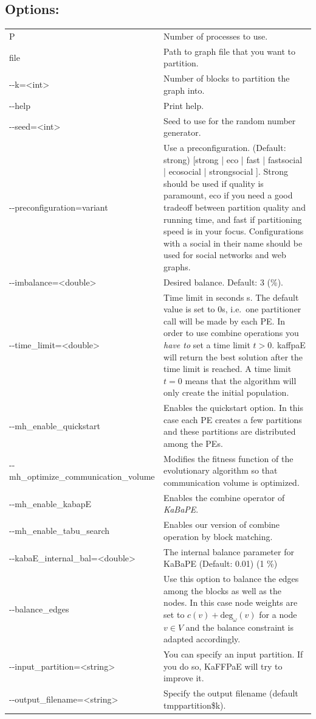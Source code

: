 \documentclass[11pt]{article}
\newcommand{\ie}{i.e.\ }
\begin{document}
\subsection*{Options:\\} 
\begin{tabularx}{\textwidth}{lX}
  P                                     & Number of processes to use.  \\
  file                        & Path to graph file that you want to partition. \\
  -{}-k=<int>                             & Number of blocks to partition the graph into.\\
  -{}-help                                & Print help. \\
  -{}-seed=<int>                          & Seed to use for the random number generator. \\
  -{}-preconfiguration=variant & Use a preconfiguration. (Default: strong) [strong | eco | fast | fastsocial | ecosocial | strongsocial ]. Strong should be used if quality is paramount, eco if you need a good tradeoff between partition quality and running time, and fast if partitioning speed is in your focus. Configurations with a social in their name should be used for social networks and web graphs.\\
  -{}-imbalance=<double>                     & Desired balance. Default: 3 (\%).\\
  -{}-time\_limit=<double>                & Time limit in seconds s. The default value is set to 0s, \ie one partitioner call will be made by each PE. In order to use combine operations you \emph{have to} set a time limit $t>0$. kaffpaE will return the best solution after the time limit is reached. A time limit $t=0$ means that the algorithm will only create the initial population. \\
  -{}-mh\_enable\_quickstart              & Enables the quickstart option. In this case each PE creates a few partitions and these partitions are distributed among the PEs.\\
  -{}-mh\_optimize\_communication\_volume & Modifies the fitness function of the evolutionary algorithm so that communication volume is optimized.\\
  -{}-mh\_enable\_kabapE                  & Enables the combine operator of \emph{KaBaPE}.\\
  -{}-mh\_enable\_tabu\_search            & Enables our version of combine operation by block matching.\\
  -{}-kabaE\_internal\_bal=<double>       & The internal balance parameter for KaBaPE (Default: 0.01) (1 \%)\\
  -{}-balance\_edges                      & Use this option to balance the edges among the blocks as well as the nodes. In this case node weights are set to $c(v)+\text{deg}_\omega(v)$ for a node $v\in V$ and the balance constraint is adapted accordingly. \\
  -{}-input\_partition=<string> & You can specify an input partition. If you do so, KaFFPaE will try to improve it.  \\
  -{}-output\_filename=<string>               & Specify the output filename (default tmppartition\$k). \\
\end{tabularx}
\end{document}
